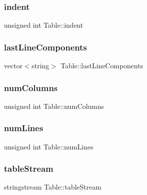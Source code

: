 \subsubsection{\texorpdfstring{indent}{indent}}
{\footnotesize\ttfamily unsigned int Table\+::indent\hspace{0.3cm}{\ttfamily [private]}}

\hypertarget{class_table_a2e6a2cba72cb9975758d05507ded659e}{}\label{class_table_a2e6a2cba72cb9975758d05507ded659e} 
\subsubsection{\texorpdfstring{last\+Line\+Components}{lastLineComponents}}
{\footnotesize\ttfamily vector$<$string$>$ Table\+::last\+Line\+Components\hspace{0.3cm}{\ttfamily [private]}}

\hypertarget{class_table_a88a6ec978fe9116bbfed4e7aa066b5e2}{}\label{class_table_a88a6ec978fe9116bbfed4e7aa066b5e2} 
\subsubsection{\texorpdfstring{num\+Columns}{numColumns}}
{\footnotesize\ttfamily unsigned int Table\+::num\+Columns\hspace{0.3cm}{\ttfamily [private]}}

\hypertarget{class_table_a0e4ed290246197725eee0c0a266b85d2}{}\label{class_table_a0e4ed290246197725eee0c0a266b85d2} 
\subsubsection{\texorpdfstring{num\+Lines}{numLines}}
{\footnotesize\ttfamily unsigned int Table\+::num\+Lines\hspace{0.3cm}{\ttfamily [private]}}

\hypertarget{class_table_a9df4c1c33927ef0b7cd474d4420a7278}{}\label{class_table_a9df4c1c33927ef0b7cd474d4420a7278} 
\subsubsection{\texorpdfstring{table\+Stream}{tableStream}}
{\footnotesize\ttfamily stringstream Table\+::table\+Stream}

